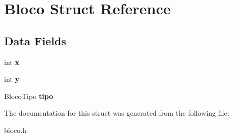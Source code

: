\hypertarget{structBloco}{\section{Bloco Struct Reference}
\label{structBloco}
}
\subsection*{Data Fields}
\begin{DoxyCompactItemize}
\item 
\hypertarget{structBloco_aa5843899788286dd0e25dc8047623c89}{int {\bfseries x}}\label{structBloco_aa5843899788286dd0e25dc8047623c89}

\item 
\hypertarget{structBloco_aa404f817cc534e68db2a25443b894e98}{int {\bfseries y}}\label{structBloco_aa404f817cc534e68db2a25443b894e98}

\item 
\hypertarget{structBloco_a437b8ab26d552cb0a375a51d48bf793f}{Bloco\-Tipo {\bfseries tipo}}\label{structBloco_a437b8ab26d552cb0a375a51d48bf793f}

\end{DoxyCompactItemize}


The documentation for this struct was generated from the following file\-:\begin{DoxyCompactItemize}
\item 
bloco.\-h\end{DoxyCompactItemize}
